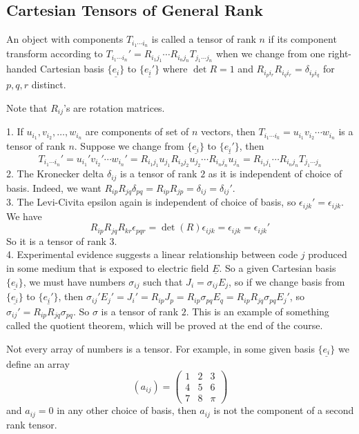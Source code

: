 \subsection{Cartesian Tensors of General Rank}
\begin{definition}
    An object with components $T_{i_1\cdots i_n}$ is called a tensor of rank $n$ if its component transform according to $T_{i_1\cdots i_n}'=R_{i_1j_1}\cdots R_{i_nj_n}T_{j_1\cdots j_n}$ when we change from one right-handed Cartesian basis $\{\underline{e_i}\}$ to $\{\underline{e_i'}\}$ where $\det R=1$ and $R_{i_pi_r}R_{i_qi_r}=\delta_{i_pi_q}$ for $p,q,r$ distinct.
\end{definition}
Note that $R_{ij}$'s are rotation matrices.
\begin{example}
    1. If $u_{i_1},v_{i_2},\ldots,w_{i_n}$ are components of set of $n$ vectors, then $T_{i_1\cdots i_k}=u_{i_1}v_{i_2}\cdots w_{i_n}$ is a tensor of rank $n$.
    Suppose we change from $\{\underline{e_i}\}$ to $\{\underline{e_i'}\}$, then
    $$T_{i_1\cdots i_n}'=u_{i_1}'v_{i_2}'\cdots w_{i_n}'=R_{i_1j_1}u_{j_1}R_{i_2j_2}u_{j_2}\cdots R_{i_nj_n}u_{j_n}=R_{i_1j_1}\cdots R_{i_nj_n}T_{j_1\cdots j_n}$$
    2. The Kronecker delta $\delta_{ij}$ is a tensor of rank $2$ as it is independent of choice of basis.
    Indeed, we want $R_{ip}R_{jq}\delta_{pq}=R_{ip}R_{jp}=\delta_{ij}=\delta_{ij}'$.\\
    3. The Levi-Civita epsilon again is independent of choice of basis, so $\epsilon_{ijk}'=\epsilon_{ijk}$.
    We have
    $$R_{ip}R_{jq}R_{kr}\epsilon_{pqr}=\det(R)\epsilon_{ijk}=\epsilon_{ijk}=\epsilon_{ijk}'$$
    So it is a tensor of rank $3$.\\
    4. Experimental evidence suggests a linear relationship between code $j$ produced in some medium that is exposed to electric field $\underline{E}$.
    So a given Cartesian basis $\{\underline{e_i}\}$, we must have numbers $\sigma_{ij}$ such that $J_i=\sigma_{ij}E_j$, so if we change basis from $\{\underline{e_i}\}$ to $\{\underline{e_i'}\}$, then $\sigma_{ij}'E_j'=J_i'=R_{ip}J_p=R_{ip}\sigma_{pq}E_q=R_{ip}R_{jq}\sigma_{pq}E_j'$, so $\sigma_{ij}'=R_{ip}R_{jq}\sigma_{pq}$.
    So $\sigma$ is a tensor of rank $2$.
    This is an example of something called the quotient theorem, which will be proved at the end of the course.
\end{example}
\begin{example}
    Not every array of numbers is a tensor.
    For example, in some given basis $\{\underline{e_i}\}$ we define an array
    $$(a_{ij})=\begin{pmatrix}
        1&2&3\\
        4&5&6\\
        7&8&\pi
    \end{pmatrix}$$
    and $a_{ij}=0$ in any other choice of basis, then $a_{ij}$ is not the component of a second rank tensor.
\end{example}
